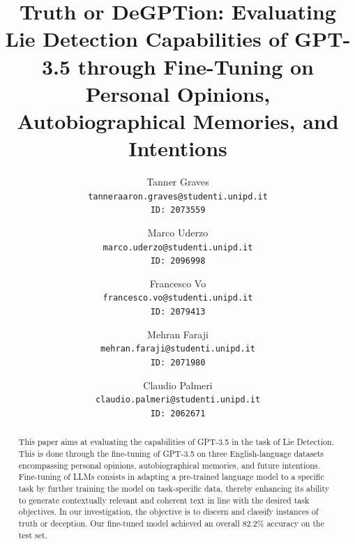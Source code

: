 \documentclass[10pt,twocolumn,letterpaper]{article}
\begin{document}
\title{Truth or DeGPTion: Evaluating Lie Detection Capabilities of GPT-3.5 through Fine-Tuning on Personal Opinions, Autobiographical Memories, and Intentions}

\author{
Tanner Graves\\
{\tt\small tanneraaron.graves@studenti.unipd.it} \\
{\tt\small ID: 2073559} \\
\and
Marco Uderzo\\
{\tt\small marco.uderzo@studenti.unipd.it} \\
{\tt\small ID: 2096998} \\
\and
Francesco Vo \\
{\tt\small francesco.vo@studenti.unipd.it} \\
{\tt\small ID: 2079413} \\
\and
Mehran Faraji\\
{\tt\small mehran.faraji@studenti.unipd.it} \\
{\tt\small ID: 2071980} \\
\and
Claudio Palmeri \\
{\tt\small claudio.palmeri@studenti.unipd.it} \\
{\tt\small ID: 2062671} \\
}

\maketitle


\begin{abstract}
This paper aims at evaluating the capabilities of GPT-3.5 in the task of Lie Detection.
This is done through the fine-tuning of GPT-3.5 on three English-language datasets encompassing 
personal opinions, autobiographical memories, and future intentions. 
Fine-tuning of LLMs consists in adapting a pre-trained language model to a specific 
task by further training the model on task-specific data, thereby 
enhancing its ability to generate contextually relevant and coherent text in 
line with the desired task objectives. In our investigation, the objective is to 
discern and classify instances of truth or deception.
Our fine-tuned model achieved an overall 82.2\% accuracy on the test set.

\end{abstract}

\end{document}
